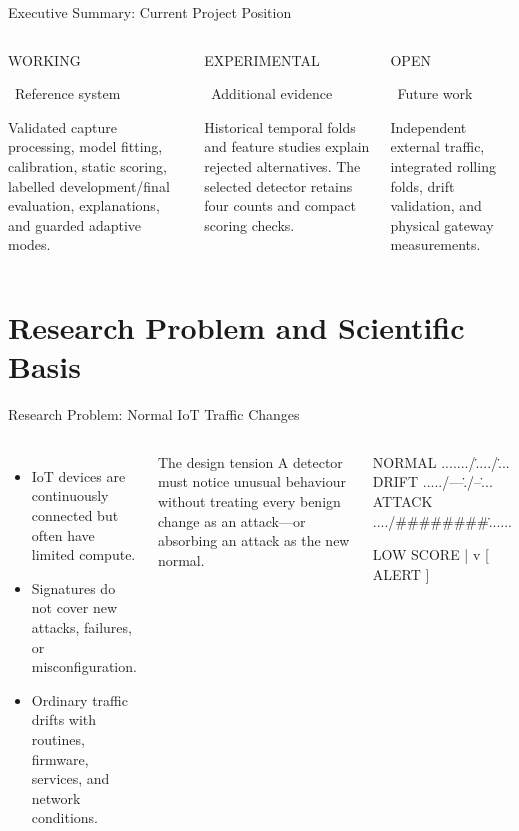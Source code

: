 \documentclass[aspectratio=169,10pt]{beamer}
\newcommand{\workingbadge}{%
  \colorbox{burgundy!13}{\color{darkburgundy}\scriptsize\bfseries\strut WORKING}}
\newcommand{\experimentalbadge}{%
  \colorbox{charcoal!13}{\color{charcoal}\scriptsize\bfseries\strut EXPERIMENTAL}}
\newcommand{\openbadge}{%
  \colorbox{dustyrose!18}{\color{burgundy}\scriptsize\bfseries\strut OPEN}}
\begin{document}
\begin{frame}{Executive Summary: Current Project Position}
\begin{columns}[T,onlytextwidth]
\begin{exampleblock}{\workingbadge\ Reference system}
\small
Validated capture processing, model fitting, calibration, static scoring,
labelled development/final evaluation, explanations, and guarded adaptive modes.
\end{exampleblock}

\begin{block}{\experimentalbadge\ Additional evidence}
\small
Historical temporal folds and feature studies explain rejected alternatives.
The selected detector retains four counts and compact scoring checks.
\end{block}

\begin{alertblock}{\openbadge\ Future work}
\small
Independent external traffic, integrated rolling folds, drift validation,
and physical gateway measurements.
\end{alertblock}
\end{columns}

\end{frame}

\section{Research Problem and Scientific Basis}

\begin{frame}[fragile]{Research Problem: Normal IoT Traffic Changes}
\begin{columns}[T,onlytextwidth]
\begin{itemize}
  \item IoT devices are continuously connected but often have limited compute.
  \item Signatures do not cover new attacks, failures, or misconfiguration.
  \item Ordinary traffic drifts with routines, firmware, services, and network
  conditions.
\end{itemize}

\vspace{0.35cm}
\begin{alertblock}{The design tension}
A detector must notice unusual behaviour without treating every benign change
as an attack---or absorbing an attack as the new normal.
\end{alertblock}

\begin{asciiart}
NORMAL   ......./\...../\....
DRIFT    ...../---\../--\....
ATTACK   ..../########\.......

          LOW SCORE
              |
              v
          [  ALERT  ]
\end{asciiart}
\end{columns}
\end{frame}
\end{document}
